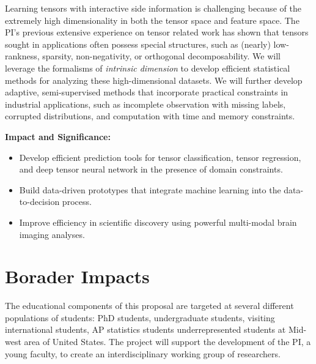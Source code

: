 \documentclass[10pt]{article}
\DeclareRobustCommand{\mybox}[2][gray!20]{%
\begin{tcolorbox}[   %
        breakable,
        left=0pt,
        right=0pt,
        top=0pt,
        bottom=0pt,
        colback=#1,
        colframe=#1,
        width=\dimexpr\textwidth\relax, 
        enlarge left by=0mm,
        boxsep=5pt,
        arc=0pt,outer arc=0pt,
        ]
        #2
\end{tcolorbox}
}
\DeclareRobustCommand{\mybox}[2][gray!20]{%
\begin{tcolorbox}[   %
        breakable,
        left=0pt,
        right=0pt,
        top=0pt,
        bottom=0pt,
        colback=#1,
        colframe=#1,
        width=\dimexpr\textwidth\relax, 
        enlarge left by=0mm,
        boxsep=5pt,
        arc=0pt,outer arc=0pt,
        ]
        #2
\end{tcolorbox}
}
\theoremstyle{definition}
\theoremstyle{definition}
\theoremstyle{definition}
\begin{document}
Learning tensors with interactive side information is challenging because of the extremely high dimensionality in both the tensor space and feature space. The PI's previous extensive experience on tensor related work has shown that tensors sought in applications often possess special structures, such as (nearly) low-rankness, sparsity, non-negativity, or orthogonal decomposability. We will leverage the formalisms of \emph{intrinsic dimension} to develop efficient statistical methods for analyzing these high-dimensional datasets. We will further develop adaptive, semi-supervised methods that incorporate practical constraints in industrial applications, such as incomplete observation with missing labels, corrupted distributions, and computation with time and memory constraints. 

\mybox[gray!20]{{\bf Impact and Significance:} 
\begin{itemize}[leftmargin=*]
\item Develop efficient prediction tools for tensor classification, tensor regression, and deep tensor neural network in the presence of domain constraints.
\item Build data-driven prototypes that integrate machine learning into the data-to-decision process. 
\item Improve efficiency in scientific discovery using powerful multi-modal brain imaging analyses. 
\end{itemize}
}


\section{Borader Impacts}
The educational components of this proposal are targeted at several different populations of students: PhD students, undergraduate students, visiting international students, AP statistics students underrepresented students at Mid-west area of United States. The project will support the development of the PI, a young faculty, to create an interdisciplinary working group of researchers.
\end{document}
